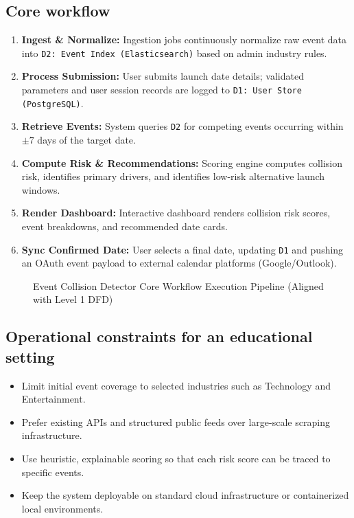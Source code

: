 \documentclass[12pt]{article}
\begin{document}
\subsection{Core workflow}
\begin{enumerate}[leftmargin=0.7cm]
\item \textbf{Ingest \& Normalize:} Ingestion jobs continuously normalize raw event data into \texttt{D2: Event Index (Elasticsearch)} based on admin industry rules.
\item \textbf{Process Submission:} User submits launch date details; validated parameters and user session records are logged to \texttt{D1: User Store (PostgreSQL)}.
\item \textbf{Retrieve Events:} System queries \texttt{D2} for competing events occurring within $\pm 7$ days of the target date.
\item \textbf{Compute Risk \& Recommendations:} Scoring engine computes collision risk, identifies primary drivers, and identifies low-risk alternative launch windows.
\item \textbf{Render Dashboard:} Interactive dashboard renders collision risk scores, event breakdowns, and recommended date cards.
\item \textbf{Sync Confirmed Date:} User selects a final date, updating \texttt{D1} and pushing an OAuth event payload to external calendar platforms (Google/Outlook).
\end{enumerate}

\begin{figure}[H]
\centering
{}
\caption{Event Collision Detector Core Workflow Execution Pipeline (Aligned with Level 1 DFD)}
\end{figure}

\subsection{Operational constraints for an educational setting}
\begin{itemize}[leftmargin=0.7cm]
\item Limit initial event coverage to selected industries such as Technology and Entertainment.
\item Prefer existing APIs and structured public feeds over large-scale scraping infrastructure.
\item Use heuristic, explainable scoring so that each risk score can be traced to specific events.
\item Keep the system deployable on standard cloud infrastructure or containerized local environments.
\end{itemize}
\end{document}
